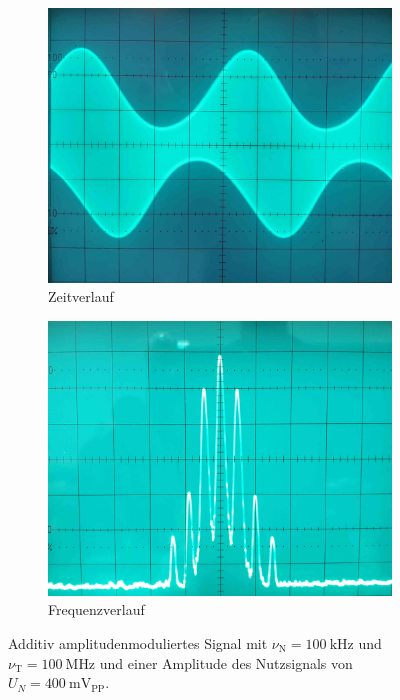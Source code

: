 \documentclass[a4paper,twoside,final]{article}
\begin{document}
\begin{figure}[htp]
    \centering
    \begin{subfigure}{0.45\textwidth}
        \includegraphics[width=\textwidth]{Bilder/AM_400mV_Amplitude.jpg}
        \caption{Zeitverlauf}
    \end{subfigure}\hspace{1cm}
    \begin{subfigure}{0.45\textwidth}
        \includegraphics[width=\textwidth]{Bilder/AM_400mV_Frequenz.jpg}
        \caption{Frequenzverlauf}
    \end{subfigure}
    \caption{Additiv amplitudenmoduliertes Signal mit $\nu_\text{N} = \SI{100}{\kilo\hertz}$ und $\nu_\text{T} = \SI{100}{\mega\hertz}$ und einer Amplitude des Nutzsignals von $U_N = \SI{400}{\milli\volt_\text{PP}}$.}
    \label{fig:Modulation_400mV}
\end{figure}\\
\end{document}
